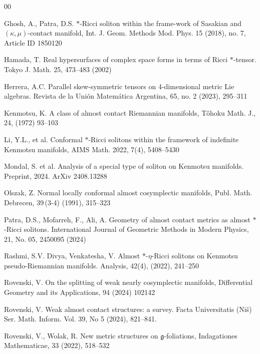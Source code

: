 \documentclass[11pt,a4paper,twoside]{article}
\begin{document}
{\begin{thebibliography}{00}

Ghosh, A., Patra, D.S. $\ast$-Ricci soliton within the frame-work of Sasakian and $(\kappa,\mu)$-contact mani\-fold,
Int. J. Geom. Methods Mod. Phys. 15 (2018), no. 7, Article ID 1850120

Hamada, T. Real hypersurfaces of complex space forms in terms of Ricci $\ast$-tensor. Tokyo J. Math. 25, 473--483
(2002)

Herrera, A.C. {Parallel skew-symmetric tensors on 4-dimensional metric Lie algebras}.
Revista de la Uni\'{o}n Matem\'{a}tica Argentina, {65}, no. 2 (2023), 295--311

Kenmotsu, K. {A class of almost contact Riemannian manifolds}, T\^{o}hoku Math. J., {24}, (1972) 93--103

 Li, Y.L., et al.
 Conformal $\ast$-Ricci solitons within the framework of indefinite Kenmotsu manifolds, AIMS Math. 2022, 7(4), 5408--5430

 Mondal, S. et al. Analysis of a special type of soliton on Kenmotsu manifolds. Preprint, 2024. ArXiv 2408.13288

Olszak, Z. Normal locally conformal almost cosymplectic manifolds, Publ. Math. Debrecen, 39\,(3-4) (1991), 315--323

Patra, D.S., Mofarreh, F., Ali, A.
Geometry of almost contact metrics as almost $\ast$-Ricci solitons. International Journal of Geometric Methods in Modern Physics, 21, No. 05, 2450095 (2024)

Rashmi, S.V. Divya, Venkatesha, V. Almost $\ast$-$\eta$-Ricci solitons on Kenmotsu pseudo-Riemannian manifolds. Analysis,  42(4), (2022), 241--250

Rovenski, V. On the splitting of weak nearly cosymplectic manifolds, Differential Geometry and its Applications, 94 (2024) 102142 %

Rovenski, V. Weak almost contact structures: a survey. Facta Universitatis (Ni\v{s}) Ser. Math. Inform. Vol. 39, No 5 (2024), 821--841.

Rovenski, V., Wolak, R. {New metric structures on $\mathfrak{g}$-foliations}, Indagationes Mathematicae, 33 (2022), 518--532


\end{thebibliography}}
\end{document}
